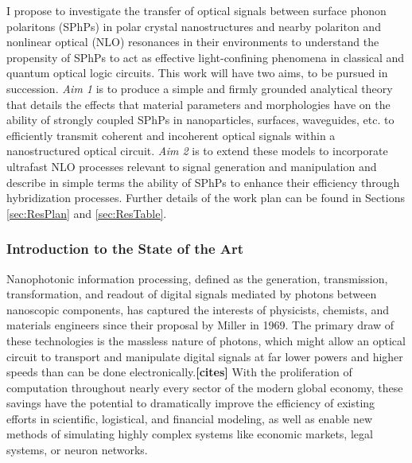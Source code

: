 \documentclass[11pt,a4paper]{article}
\begin{document}
I propose to investigate the transfer of optical signals between surface phonon polaritons (SPhPs) in polar crystal nanostructures and nearby polariton and nonlinear optical (NLO) resonances in their environments to understand the propensity of SPhPs to act as effective light-confining phenomena in classical and quantum optical logic circuits. This work will have two aims, to be pursued in succession. \textit{Aim 1} is to produce a simple and firmly grounded analytical theory that details the effects that material parameters and morphologies have on the ability of strongly coupled SPhPs in nanoparticles, surfaces, waveguides, etc. to efficiently transmit coherent and incoherent optical signals within a nanostructured optical circuit. \textit{Aim 2} is to extend these models to incorporate ultrafast NLO processes relevant to signal generation and manipulation and describe in simple terms the ability of SPhPs to enhance their efficiency through hybridization processes. Further details of the work plan can be found in Sections \ref{sec:ResPlan} and \ref{sec:ResTable}.







\subsubsection{Introduction to the State of the Art}

Nanophotonic information processing, defined as the generation, transmission, transformation, and readout of digital signals mediated by photons between nanoscopic components, has captured the interests of physicists, chemists, and materials engineers since their proposal by Miller in 1969.\cite{miller1969integrated} The primary draw of these technologies is the massless nature of photons, which might allow an optical circuit to transport and manipulate digital signals at far lower powers and higher speeds than can be done electronically.\textbf{[cites]} With the proliferation of computation throughout nearly every sector of the modern global economy, these savings have the potential to dramatically improve the efficiency of existing efforts in scientific, logistical, and financial modeling, as well as enable new methods of simulating highly complex systems like economic markets, legal systems, or neuron networks.
\end{document}
